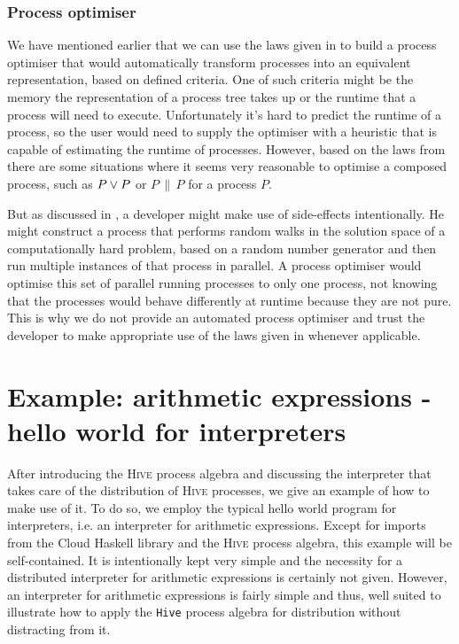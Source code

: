 \subsubsection{Process optimiser}
We have mentioned earlier that we can use the laws given in  to build a process optimiser that would automatically transform processes into an equivalent representation, based on defined criteria. One of such criteria might be the memory the representation of a process tree takes up or the runtime that a process will need to execute. Unfortunately it's hard to predict the runtime of a process, so the user would need to supply the optimiser with a heuristic that is capable of estimating the runtime of processes. However, based on the laws from  there are some situations where it seems very reasonable to optimise a composed process, such as $P \vee P$ or $P \,\parallel\, P$ for a process $P$.

But as discussed in , a developer might make use of side-effects intentionally. He might construct a process that performs random walks in the solution space of a computationally hard problem, based on a random number generator and then run multiple instances of that process in parallel. A process optimiser would optimise this set of parallel running processes to only one process, not knowing that the processes would behave differently at runtime because they are not pure. This is why we do not provide an automated process optimiser and trust the developer to make appropriate use of the laws given in  whenever applicable.

\section{Example: arithmetic expressions - hello world for interpreters}
\label{chp:example}
After introducing the \textsc{Hive} process algebra and discussing the interpreter that takes care of the distribution of \textsc{Hive} processes, we give an example of how to make use of it. To do so, we employ the typical hello world program for interpreters, i.e. an interpreter for arithmetic expressions. Except for imports from the \textsf{Cloud Haskell} library and the \textsc{Hive} process algebra, this example will be self-contained. It is intentionally kept very simple and the necessity for a distributed interpreter for arithmetic expressions is certainly not given. However, an interpreter for arithmetic expressions is fairly simple and thus, well suited to illustrate how to apply the \texttt{Hive} process algebra for distribution without distracting from it.

